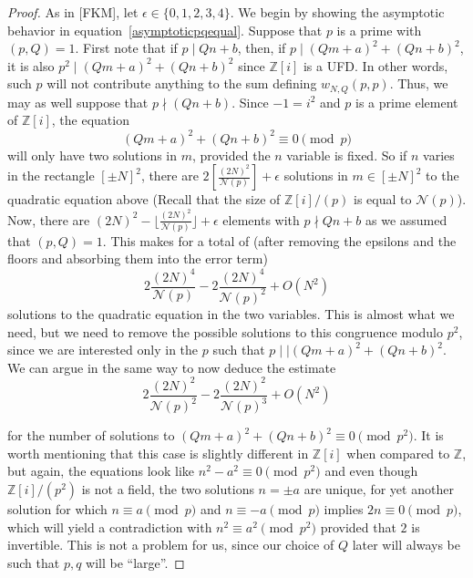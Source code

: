 \documentclass[11pt]{amsart}
\theoremstyle{definition}
\newcommand{\NN}{{\mathcal N}}
\newcommand{\Z}{{\mathbb Z}}
\begin{document}
\begin{proof}
As in [FKM], let $\epsilon \in \{0,1,2,3,4\}$. We begin by showing the asymptotic behavior in equation~\eqref{asymptoticpqequal}. Suppose that $p$ is a prime with $(p, Q)=1$. First note that if $p \mid Qn+b$, then, if $p \mid (Qm+a)^2+(Qn+b)^2$, it is also $p^2 \mid (Qm+a)^2+(Qn+b)^2$ since $\Z[i]$ is a UFD. In other words, such $p$ will not contribute anything to the sum defining $w_{N,Q}(p,p)$. Thus, we may as well suppose that $p \nmid (Qn+b)$. Since $-1=i^2$ and $p$ is a prime element of $\Z[i]$, the equation
\[
(Qm+a)^2+(Qn+b)^2 \equiv 0 \pmod p
\]
will only have two solutions in $m$, provided the $n$ variable is fixed. So if $n$ varies in the rectangle $[\pm N]^2$, there are $2\left[ \frac{(2N)^2}{\NN(p)}\right]+\epsilon$ solutions in $m \in [\pm N]^2$ to the quadratic equation above (Recall that the size of $\Z[i]/(p)$ is equal to $\NN(p)$). Now, there are $(2N)^2-\lfloor \frac{(2N)^2}{\NN(p)}\rfloor+\epsilon$ elements with $p \nmid Qn+b$ as we assumed that $(p, Q) =1$. This makes for a total of (after removing the epsilons and the floors and absorbing them into the error term)
\[
2\frac{(2N)^4}{\NN(p)}-2\frac{(2N)^4}{\NN(p)^2}+O(N^2)
\]
solutions to the quadratic equation in the two variables. This is almost what we need, but we need to remove the possible solutions to this congruence modulo $p^2$, since we are interested only in the $p$ such that $p \mid\mid (Qm+a)^2+(Qn+b)^2$. We can argue in the same way to now deduce the estimate
\[
2 \frac{(2N)^2}{\NN(p)^2}-2\frac{(2N)^2}{\NN(p)^3}+O(N^2)
\]

for the number of solutions to $(Qm+a)^2+(Qn+b)^2 \equiv 0 \pmod{p^2}$. It is worth mentioning that this case is slightly different in $\Z[i]$ when compared to $\Z$, but again, the equations look like $n^2-a^2\equiv 0 \pmod{p^2}$ and even though $\Z[i]/(p^2)$ is not a field, the two solutions $n=\pm a$ are unique, for yet another solution for which $n \equiv a \pmod p$ and $n \equiv -a \pmod p$ implies $2n \equiv 0 \pmod p$, which will yield a contradiction with $n^2 \equiv a^2 \pmod{p^2}$ provided that $2$ is invertible. This is not a problem for us, since our choice of $Q$ later will always be such that $p, q$ will be ``large''.


\end{proof}
\end{document}

